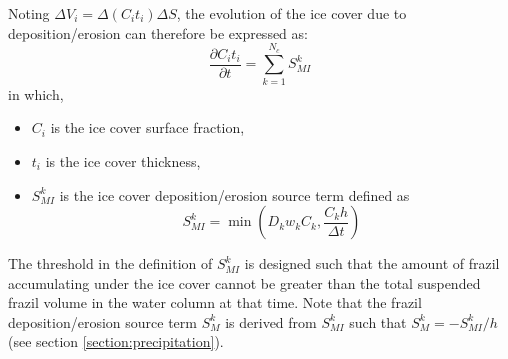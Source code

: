 \begin{enumerate}
Noting $\Delta V_i = \Delta (C_i t_i) \Delta S$, the evolution of the ice cover due to deposition/erosion 
can therefore be expressed as:
\begin{equation}
\dfrac{\partial C_i t_i}{\partial t} = \sum_{k=1}^{N_c} S_{MI}^k
\label{eq:prec}
\end{equation}
in which,
\begin{itemize}
  \item $C_i$ is the ice cover surface fraction,
  \item $t_i$ is the ice cover thickness,
  \item $S_{MI}^k$ is the ice cover deposition/erosion source term defined as 
\begin{equation}
S_{MI}^k = \min \left( D_k w_k C_k, \dfrac{C_k h}{\Delta t} \right)
\end{equation}
\end{itemize}
The threshold in the definition of $S_{MI}^k$ is designed such that the amount of frazil accumulating under the ice cover cannot be greater than the total suspended frazil volume in the water column at that time. Note that the frazil deposition/erosion source term $S_{M}^k$ is derived from $S_{MI}^k$ such that $S_{M}^k = -S_{MI}^k / h$ (see section \ref{section:precipitation}).


\end{enumerate}
